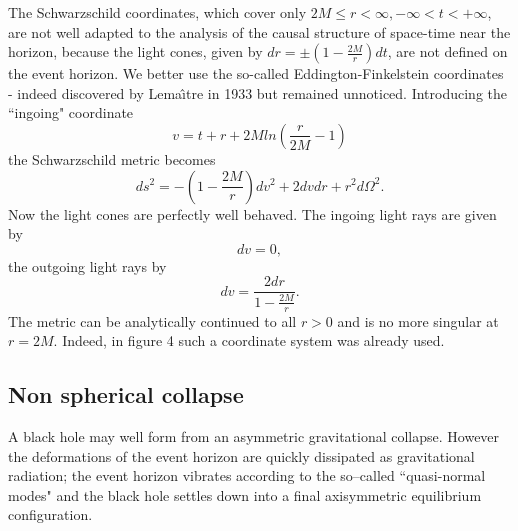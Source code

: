 \documentclass[12pt]{article}
\begin{document}
The Schwarzschild coordinates, which cover only 
$2M \le r < \infty , - \infty < t < + \infty $, are not well adapted to the 
analysis of the causal structure of
space-time near the horizon,  because the light cones, given by $dr = \pm
(1-\frac{2M}{r})dt$, are not defined on the event horizon. We better use the
so-called Eddington-Finkelstein coordinates - indeed discovered by 
Lema\^{\i}tre in
1933 but remained unnoticed. Introducing the ``ingoing" coordinate 
\begin{equation}
v = t+r+2Mln(\frac{r}{2M}-1)    
\end{equation}
 the Schwarzschild metric becomes 
\begin{equation}
 ds^2 = - (1-\frac{2M}{r})dv^2 + 2 dvdr + r^2d\Omega^2.
\end{equation}
Now the light cones are perfectly well behaved. The ingoing light rays are
given by 
\begin{equation}
dv = 0, 
\end{equation}
the outgoing light rays by 
\begin{equation}
dv = \frac{2dr}{1-\frac{2M}{r}}.
\end{equation}
The metric can be analytically continued to all $r>0$ and
is no more singular at $r=2M$.
Indeed, in figure 4 such a coordinate system was already used.


\subsection {Non spherical collapse}
A black hole may well form from an asymmetric gravitational collapse. However
the deformations of the event horizon are quickly dissipated as 
gravitational radiation; the event horizon vibrates according to the so--called
``quasi-normal modes" and the black hole settles down into a final axisymmetric
equilibrium configuration.  
\end{document}
